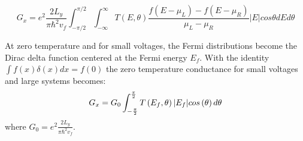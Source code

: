\documentclass[prl,twocolumn,aps,superscriptaddress,floatfix,10pt]{revtex4}
\begin{document}
			\begin{widetext}
			\begin{equation}
				G_{x}=e^{2}\frac{2L_{y}}{\pi\hbar^{2}v_{f}}\int^{\pi/2}_{-\pi/2} \int^{\infty}_{-\infty} T\left(E, \theta\right)\frac{f\left(E-\mu_{L}\right)-f\left(E-\mu_{R}\right)}{\mu_{L}-\mu_{R}}|E|cos\theta dE d\theta
			\end{equation}
			\end{widetext}
			At zero temperature and for small voltages, the Fermi distributions become the Dirac delta function centered at the Fermi energy $E_{f}$. With the identity $\int f(x)\delta(x) dx=f(0)$ the zero temperature conductance for small voltages and large systems becomes:
			\begin{equation}
				G_{x}= G_{0}\int^{\frac{\pi}{2}}_{-\frac{\pi}{2}} T\left(E_{f},\theta\right)|E_{f}|cos\left(\theta\right)d\theta\\
			\end{equation}
			where $G_{0}=e^{2}\frac{2L_{y}}{\pi\hbar^{2}v_{f}}$.
\end{document}
